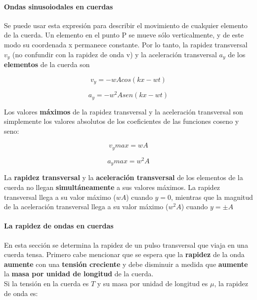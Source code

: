 \documentclass[10pt]{article}
\begin{document}
\paragraph{Ondas sinusoiodales en cuerdas}

Se puede usar esta expresión para describir el movimiento de cualquier elemento de la
cuerda. Un elemento en el punto P se mueve sólo verticalmente, y de este modo su coordenada x 
permanece constante. Por lo tanto, la rapidez transversal $v_y$ (no confundir con la 
rapidez de onda v) y la aceleración transversal $a_y$ de los \textbf{elementos} de la cuerda son

\begin{equation*}
    v_y = -wA cos(kx-wt)
\end{equation*}

\begin{equation*}
    a_y = -w^2 A sen(kx-wt)
\end{equation*}

Los valores \textbf{máximos} de la rapidez transversal y la
aceleración transversal son simplemente los valores absolutos de los coeficientes de las
funciones coseno y seno:

\begin{equation*}
    v_y max = wA
\end{equation*}

\begin{equation*}
    a_y max = w^2 A
\end{equation*}

La \textbf{rapidez transversal} y la \textbf{aceleración transversal} de los elementos de la cuerda no llegan
\textbf{simultáneamente} a sus valores máximos. La rapidez transversal llega a su valor máximo
($wA$) cuando $y=0$, mientras que la magnitud de la aceleración transversal llega a su valor
máximo ($w^2A$) cuando $y= \pm A$

\paragraph{La rapidez de ondas en cuerdas}

En esta sección se determina la rapidez de un pulso transversal que viaja en una cuerda
tensa. Primero cabe mencionar que se espera que la \textbf{rapidez} de la onda \textbf{aumente} con una
\textbf{tensión creciente} y debe disminuir a medida que \textbf{aumente} la \textbf{masa por unidad de longitud} 
de la cuerda.\\
\linebreak
Si la tensión en la cuerda es $T$ y su masa por unidad
de longitud es $\mu$, la rapidez de onda es:
\end{document}
